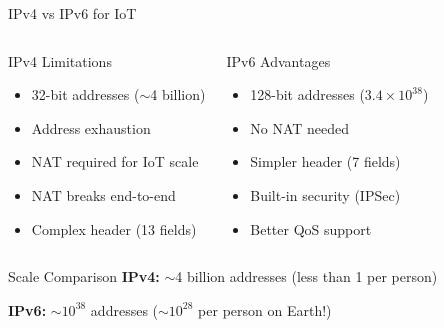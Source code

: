 \documentclass[aspectratio=169,11pt]{beamer}
\begin{document}
\begin{frame}{IPv4 vs IPv6 for IoT}
    \begin{columns}
        \begin{block}{IPv4 Limitations}
            \begin{itemize}
                \item 32-bit addresses ($\sim$4 billion)
                \item Address exhaustion
                \item NAT required for IoT scale
                \item NAT breaks end-to-end
                \item Complex header (13 fields)
            \end{itemize}
        \end{block}
        
        \begin{block}{IPv6 Advantages}
            \begin{itemize}
                \item 128-bit addresses ($3.4 \times 10^{38}$)
                \item No NAT needed
                \item Simpler header (7 fields)
                \item Built-in security (IPSec)
                \item Better QoS support
            \end{itemize}
        \end{block}
    \end{columns}
    
    \vspace{0.3cm}
    \begin{exampleblock}{Scale Comparison}
        \textbf{IPv4:} $\sim$4 billion addresses (less than 1 per person)
        
        \textbf{IPv6:} $\sim 10^{38}$ addresses ($\sim 10^{28}$ per person on Earth!)
    \end{exampleblock}
\end{frame}
\end{document}
